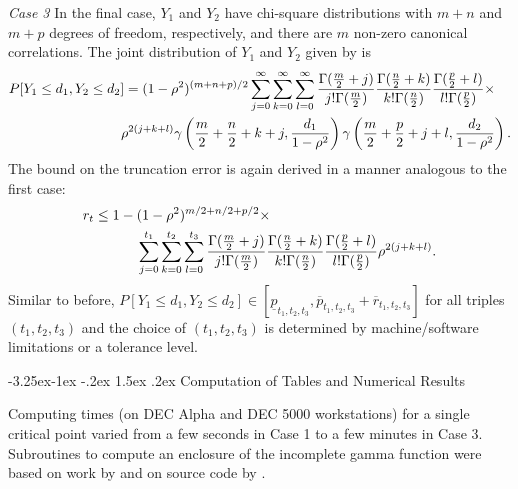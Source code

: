 \documentclass[10pt,letterpaper]{article}
\makeatletter
\renewcommand\subsection{\@startsection{subsection}{2}{\z@}%
                 {-3.25ex\@plus -1ex \@minus -.2ex}%
                 {1.5ex \@plus .2ex}%
                 {\scshape\normalsize\bfseries}} %
\makeatother
\begin{document}
{\it Case 3} In the final case, 
$Y_1$ and $Y_2$ have chi-square distributions with 
$m+n$ and $m+p$ degrees of freedom, respectively, and
there are $m$ non-zero canonical correlations.
The joint distribution of $Y_1$ and $Y_2$ given by \cite{Gunst} is
\begin{eqnarray}
\lefteqn{P[Y_1 \leq d_1, Y_2 \leq d_2 ]= (1-\rho^2)^{(m+n+p)/2} 
 \sum_{j=0}^\infty \sum_{k=0}^\infty  \sum_{l=0}^\infty 
 \frac{ \Gamma (\frac{m}{2}+j)}{ j! \Gamma (\frac{m}{2})  }
  \frac{ \Gamma (\frac{n}{2}+k)}{ k! \Gamma (\frac{n}{2})  }
 \frac{ \Gamma (\frac{p}{2}+l)}{ l! \Gamma (\frac{p}{2})  } 
 \times}  \nonumber \\
  & & \hspace{+1in}
 \rho^{2(j+k+l)} \gamma \left(\frac{m}{2}+\frac{n}{2}+k+j, 
          \frac{d_1}{1-\rho^2} \right)  
 \gamma \left(\frac{m}{2}+\frac{p}{2}+j+l, \frac{d_2}{1-\rho^2} \right).  
\label{cdf3} 
\end{eqnarray}
The bound on the truncation error is again derived in a manner 
analogous to the first case:
\begin{eqnarray}
\label{error3}
\lefteqn{ r_t \leq 1- (1-\rho^2)^{m/2 + n/2 + p/2}
   \times} \nonumber \hspace{3.5in}\\
   \sum_{j=0}^{t_1} \sum_{k=0}^{t_2} 
   \sum_{l=0}^{t_3} 
   \frac{\Gamma (\frac{m}{2}+j)}{ j! \Gamma (\frac{m}{2}) }
   \frac{\Gamma (\frac{n}{2}+k)}{ k! \Gamma (\frac{n}{2}) }
   \frac{\Gamma (\frac{p}{2}+l)}{ l! \Gamma (\frac{p}{2}) }
   \rho^{2(j +k +l)}. 
\end{eqnarray}
Similar to before, 
$P[Y_1 \leq d_1, Y_2 \leq d_2] \in
 [ \underline{ p}_{t_1,t_2,t_3} , 
   \overline{ p}_{t_1,t_2, t_3} + \overline{ r}_{t_1,t_2, t_3}]$
for all triples $(t_1,t_2, t_3)$ and the choice of $(t_1,t_2, t_3)$ is 
determined by machine/software limitations or a tolerance level.

\subsection{Computation of Tables and Numerical Results}

Computing times (on DEC Alpha and DEC 5000 workstations) 
for a single critical point varied from a few
seconds in Case 1 to a few minutes in Case 3.
Subroutines to compute an enclosure of the incomplete gamma function were 
based on work by \cite{WangKennedyJASA} and on source code by \cite{Gessner}.
\end{document}
